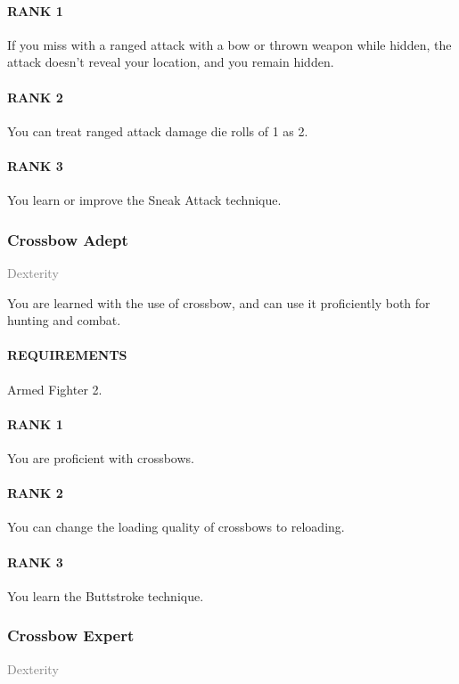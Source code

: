 \paragraph{RANK 1} If you miss with a ranged attack with a bow or thrown weapon while hidden, the attack doesn't reveal your location, and you remain hidden.
\paragraph{RANK 2} You can treat ranged attack damage die rolls of 1 as 2.
\paragraph{RANK 3} You learn or improve the Sneak Attack technique.

\subsubsection{Crossbow Adept} \label{feat::crossbowadept}
\small{\textcolor{gray}{Dexterity}}

\normalsize
You are learned with the use of crossbow, and can use it proficiently both for hunting and combat.
\paragraph{REQUIREMENTS} Armed Fighter 2.
\paragraph{RANK 1} You are proficient with crossbows.
\paragraph{RANK 2} You can change the loading quality of crossbows to reloading.
\paragraph{RANK 3} You learn the Buttstroke technique.

\subsubsection{Crossbow Expert} \label{feat::crossbowexpert}
\small{\textcolor{gray}{Dexterity}}

